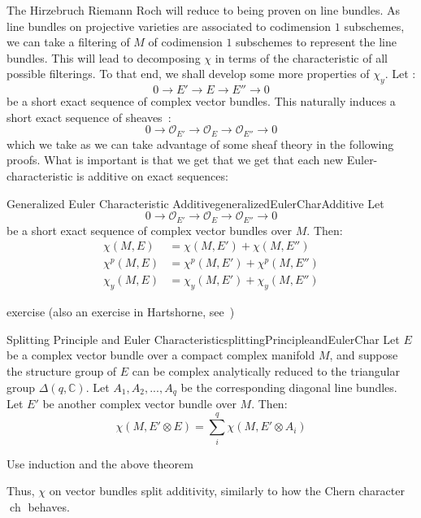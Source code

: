 \documentclass{book}
\newcommand{\C}{{\mathbb{C}}}
\newcommand{\CO}{{\mathcal{O}}}
\newcommand{\ch}{{\operatorname{ch}}}
\begin{document}
The Hirzebruch Riemann Roch will reduce to being proven on line bundles. As line bundles on projective
varieties are associated to codimension $1$ subschemes, we can take a filtering of $M$ of codimension $1$
subschemes to represent the line bundles. This will lead to decomposing $\chi$ in terms of the characteristic
of all possible filterings. To that end, we shall develop some more properties of $\chi_y$. Let
:
\[
  0 \to E' \to E \to E'' \to 0
\]
be a short exact sequence of complex vector bundles. This naturally induces a short exact sequence of
sheaves~\cite{NateAlgGeo}:
\[
  0 \to \CO_{E'} \to \CO_E \to \CO_{E''} \to 0
\]
which we take as we can take advantage of some sheaf theory in the following proofs. What is important is that
we get that we get that each new Euler-characteristic is additive on exact sequences:
\begin{thm}{Generalized Euler Characteristic Additive}{generalizedEulerCharAdditive}
  Let
\[
  0 \to \CO_{E'} \to \CO_E \to \CO_{E''} \to 0
\]
  be a short exact sequence of complex vector bundles over $M$. Then:
  \begin{align*}
   \chi(M, E) &= \chi(M, E') + \chi(M, E'')\\
   \chi^p(M, E) &= \chi^p(M, E') + \chi^p(M, E'')\\
   \chi_y(M, E) &= \chi_y(M, E') + \chi_y(M, E'')
  \end{align*}
\end{thm}

\begin{Proof}
  exercise (also an exercise in Hartshorne, see~\cite[section~2.5]{hartshorneAlgebraicGeometry2013})
\end{Proof}

\begin{thm}{Splitting Principle and Euler Characteristic}{splittingPrincipleandEulerChar}
  Let  $E$ be a complex vector bundle over a compact complex manifold $M$, and suppose the structure group of
  $E$ can be complex analytically reduced to  the triangular group $\Delta(q, \C)$. Let $A_1, A_2, ..., A_q$
  be the corresponding diagonal line bundles. Let $E'$ be another complex vector bundle over $M$. Then:
  \[
    \chi(M, E'\otimes E) = \sum_i^q \chi(M, E'\otimes A_i)
  \]
\end{thm}

\begin{Proof}
  Use induction and the above theorem
\end{Proof}

Thus, $\chi$ on vector bundles split additivity, similarly to how the Chern character $\ch$ behaves.
\end{document}
